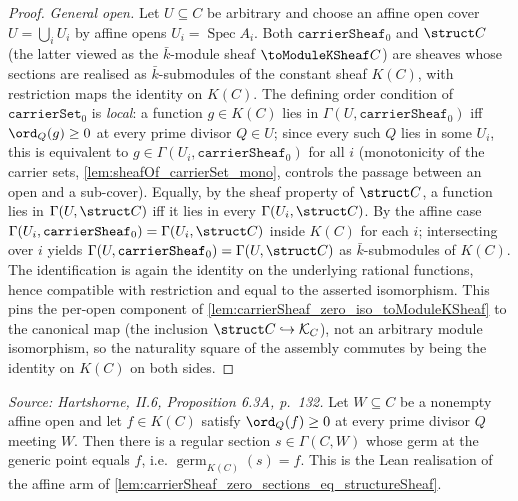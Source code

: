 \begin{proof}
  \emph{General open.} Let \(U \subseteq C\) be arbitrary and choose an affine
  open cover \(U = \bigcup_i U_i\) by affine opens \(U_i = \operatorname{Spec}
  A_i\). Both \(\texttt{carrierSheaf}_0\) and \(\struct C\) (the latter viewed
  as the \(\bar k\)-module sheaf \(\toModuleKSheaf C\)) are sheaves whose
  sections are realised as \(\bar k\)-submodules of the constant sheaf
  \(K(C)\), with restriction maps the identity on \(K(C)\). The defining order
  condition of \(\texttt{carrierSet}_0\) is \emph{local}: a function
  \(g \in K(C)\) lies in \(\Gamma(U, \texttt{carrierSheaf}_0)\) iff
  \(\ord_Q(g) \ge 0\) at every prime divisor \(Q \in U\); since every such
  \(Q\) lies in some \(U_i\), this is equivalent to \(g \in \Gamma(U_i,
  \texttt{carrierSheaf}_0)\) for all \(i\) (monotonicity of the carrier sets,
  \cref{lem:sheafOf_carrierSet_mono}, controls the passage between an open and
  a sub-cover). Equally, by the sheaf property of \(\struct C\), a function
  lies in \(\Gamma(U, \struct C)\) iff it lies in every \(\Gamma(U_i,
  \struct C)\). By the affine case \(\Gamma(U_i, \texttt{carrierSheaf}_0) =
  \Gamma(U_i, \struct C)\) inside \(K(C)\) for each \(i\); intersecting over
  \(i\) yields \(\Gamma(U, \texttt{carrierSheaf}_0) = \Gamma(U, \struct C)\) as
  \(\bar k\)-submodules of \(K(C)\). The identification is again the identity on
  the underlying rational functions, hence compatible with restriction and equal
  to the asserted isomorphism. This pins the per-open component of
  \cref{lem:carrierSheaf_zero_iso_toModuleKSheaf} to the canonical map (the
  inclusion \(\struct C \hookrightarrow \mathcal K_C\)), not an arbitrary module
  isomorphism, so the naturality square of the assembly commutes by being the
  identity on \(K(C)\) on both sides.
\end{proof}

\begin{lemma}
  \label{lem:exists_section_of_forall_order_nonneg_affineOpen}
  \textit{Source: Hartshorne, II.6, Proposition 6.3A, p.~132.}
  Let \(W \subseteq C\) be a nonempty affine open and let \(f \in K(C)\) satisfy
  \(\ord_Q(f) \ge 0\) at every prime divisor \(Q\) meeting \(W\). Then there is a
  regular section \(s \in \Gamma(C, W)\) whose germ at the generic point equals
  \(f\), i.e. \(\operatorname{germ}_{K(C)}(s) = f\). This is the Lean realisation of the affine
  arm of \cref{lem:carrierSheaf_zero_sections_eq_structureSheaf}.
\end{lemma}

